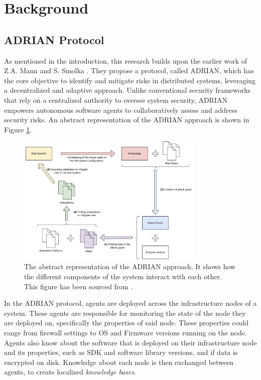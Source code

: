 \section{Background}
\label{sec:background}

\subsection{ADRIAN Protocol}
\label{ssec:adrian}

As mentioned in the introduction, this research builds upon the earlier work of Z.A. Mann and S. Smolka \cite{mann2023ADRIAN}. They propose a protocol, called ADRIAN, which has the core objective to identify and mitigate risks in distributed systems, leveraging a decentralized and adaptive approach. Unlike conventional security frameworks that rely on a centralized authority to oversee system security, ADRIAN empowers autonomous software agents to collaboratively assess and address security risks. An abstract representation of the ADRIAN approach is shown in Figure \ref{fig:adrian-architecture}.

\begin{figure}
    \centering
    \includegraphics[width=0.8\textwidth]{content/adrian-architecture.png}
    \caption{The abstract representation of the ADRIAN approach. It shows how the different components of the system interact with each other. This figure has been sourced from \cite{mann2023ADRIAN}.}
    \label{fig:adrian-architecture}
\end{figure}

In the ADRIAN protocol, agents are deployed across the infrastructure nodes of a system. These agents are responsible for monitoring the state of the node they are deployed on, specifically the properties of said node. These properties could range from firewall settings to OS and Firmware versions running on the node. Agents also know about the software that is deployed on their infrastructure node and its properties, such as SDK and software library versions, and if data is encrypted on disk. Knowledge about each node is then exchanged between agents, to create localized \emph{knowledge bases}.

